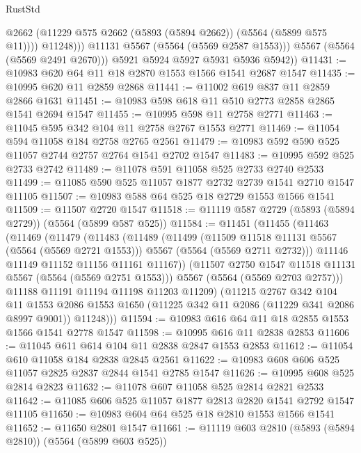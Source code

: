 \begin{lexlean}{RustStd}
\begin{coremodule}
                    @2662
                    (@11229 @575 @2662 (@5893 (@5894 @2662)) (@5564 (@5899 @575 @11))))
                  @11248)))
            @11131
            @5567
            (@5564 (@5569 @2587 @1553)))
          @5567
          (@5564 (@5569 @2491 @2670)))
        @5921
        @5924
        @5927
        @5931
        @5936
        @5942))
@11431 := @10983 @620 @64 @11 @18 @2870 @1553 @1566 @1541 @2687 @1547
@11435 := @10995 @620 @11 @2859 @2868
@11441 := @11002 @619 @837 @11 @2859 @2866 @1631
@11451 := @10983 @598 @618 @11 @510 @2773 @2858 @2865 @1541 @2694 @1547
@11455 := @10995 @598 @11 @2758 @2771
@11463 := @11045 @595 @342 @104 @11 @2758 @2767 @1553 @2771
@11469 := @11054 @594 @11058 @184 @2758 @2765 @2561
@11479 := @10983 @592 @590 @525 @11057 @2744 @2757 @2764 @1541 @2702 @1547
@11483 := @10995 @592 @525 @2733 @2742
@11489 := @11078 @591 @11058 @525 @2733 @2740 @2533
@11499 := @11085 @590 @525 @11057 @1877 @2732 @2739 @1541 @2710 @1547 @11105
@11507 := @10983 @588 @64 @525 @18 @2729 @1553 @1566 @1541
@11509 := @11507 @2720 @1547
@11518 := @11119 @587 @2729 (@5893 (@5894 @2729)) (@5564 (@5899 @587 @525))
@11584 := @11451
    (@11455
      (@11463
        (@11469
          (@11479
            (@11483
              (@11489
                (@11499
                  (@11509 @11518 @11131 @5567 (@5564 (@5569 @2721 @1553)))
                  @5567
                  (@5564 (@5569 @2711 @2732)))
                @11146
                @11149
                @11152
                @11156
                @11161
                @11167))
            (@11507 @2750 @1547 @11518 @11131 @5567 (@5564 (@5569 @2751 @1553)))
            @5567
            (@5564 (@5569 @2703 @2757)))
          @11188
          @11191
          @11194
          @11198
          @11203
          @11209)
        (@11215
          @2767
          @342
          @104
          @11
          @1553
          @2086
          @1553
          @1650
          (@11225 @342 @11 @2086 (@11229 @341 @2086 @8997 @9001))
          @11248)))
@11594 := @10983 @616 @64 @11 @18 @2855 @1553 @1566 @1541 @2778 @1547
@11598 := @10995 @616 @11 @2838 @2853
@11606 := @11045 @611 @614 @104 @11 @2838 @2847 @1553 @2853
@11612 := @11054 @610 @11058 @184 @2838 @2845 @2561
@11622 := @10983 @608 @606 @525 @11057 @2825 @2837 @2844 @1541 @2785 @1547
@11626 := @10995 @608 @525 @2814 @2823
@11632 := @11078 @607 @11058 @525 @2814 @2821 @2533
@11642 := @11085 @606 @525 @11057 @1877 @2813 @2820 @1541 @2792 @1547 @11105
@11650 := @10983 @604 @64 @525 @18 @2810 @1553 @1566 @1541
@11652 := @11650 @2801 @1547
@11661 := @11119 @603 @2810 (@5893 (@5894 @2810)) (@5564 (@5899 @603 @525))

\end{coremodule}
\end{lexlean}
